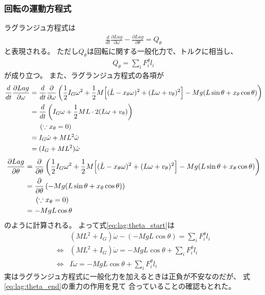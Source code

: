 \documentclass[a4paper,11pt]{jsarticle}
\begin{document}
\subsubsection*{回転の運動方程式}
ラグランジュ方程式は
\begin{align}
  \frac{d}{dt}\frac{\partial Lag}{\partial \omega} - \frac{\partial Lag}{\partial \theta} = Q_\theta
  \label{eq:lag:theta_start}
\end{align}
と表現される。
ただし$Q_\theta$は回転に関する一般化力で、トルクに相当し、
\begin{align}
  Q_\theta = \sum_i F_i^\theta l_i
\end{align}
が成り立つ。
また、ラグランジュ方程式の各項が
\begin{align}
  \frac{d}{dt}\frac{\partial Lag}{\partial \omega}
  &= \frac{d}{dt}\frac{\partial }{\partial \omega}
  \left(
    \frac{1}{2}I_G\omega^2
    + \frac{1}{2}M
    \Bigl[ (\dot{L} - x_\theta \omega)^2 + (L\omega + v_\theta)^2 \Bigr]
    - Mg ( L\sin\theta + x_\theta \cos\theta )
  \right)
  \\
  &= \frac{d}{dt} \left( I_G\omega + \frac{1}{2}ML\cdot 2(L\omega + v_\theta) \right)
  \\
  & \ \ \ \ \left( \because x_\theta = 0 \right)
  \\
  &= I_G\dot\omega + ML^2\dot\omega
  \\
  &= (I_G + ML^2)\dot\omega
\end{align}
\begin{align}
  \frac{\partial Lag}{\partial \theta}
  &= \frac{\partial }{\partial \theta}
  \left(
    \frac{1}{2}I_G\omega^2
    + \frac{1}{2}M
    \Bigl[ (\dot{L} - x_\theta \omega)^2 + (L\omega + v_\theta)^2 \Bigr]
    - Mg ( L\sin\theta + x_\theta \cos\theta )
  \right)
  \\
  &= \frac{\partial }{\partial \theta}\left( - Mg ( L\sin\theta + x_\theta \cos\theta ) \right)
  \\
  & \ \ \ \ \left( \because x_\theta = 0 \right)
  \\
  &= -MgL\cos\theta
\end{align}
のように計算される。
よって式\ref{eq:lag:theta_start}は
\begin{align}
  & (ML^2 + I_G)\dot\omega - ( -MgL\cos\theta ) = \sum_i F_i^\theta l_i
  \\
  \Leftrightarrow
  & (ML^2 + I_G)\dot\omega = -MgL\cos\theta + \sum_i F_i^\theta l_i
  \\
  \Leftrightarrow
  & I\dot\omega = -MgL\cos\theta + \sum_i F_i^\theta l_i
  \label{eq:lag:theta_end}
\end{align}
実はラグランジュ方程式に一般化力を加えるときは正負が不安なのだが、
式\ref{eq:lag:theta_end}の重力の作用を見て
合っていることの確認もとれた。
\end{document}
